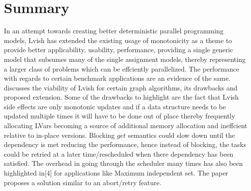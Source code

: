 \documentclass[twocolumn]{article}
\begin{document}
\section{Summary}
\label{summary}
In an attempt towards creating better deterministic parallel programming models, Lvish has extended the existing usage of monotonicity as a theme to provide better applicability, usability, performance, providing a single generic model that subsumes
many of the single assignment models, thereby representing a larger class of problems which can be effciently parallelized. The performance with regards to certain benchmark applications are an evidence of the same. \cite{newton1}discusses the viability of Lvish for certain graph algorithms, its drawbacks and proposed extension. Some of the drawbacks to highlight are the fact that Lvish side  effects are only monotonic updates and if a data structure needs to be updated multiple times it will have to be done out of place thereby frequently allocating LVars becoming a source of additional memory allocation and ineffcient relative to in-place versions. Blocking $get$ semantics could slow down until the dependency is met reducing the performance, hence instead
of blocking, the tasks could be retried at a later time/rescheduled when there dependency has been satisfied. The overhead in going through the scheduler many times has also been highlighted in[4] for applications like Maximum independent set. The
paper proposes a solution similar to an abort/retry feature.

 
\end{document}
